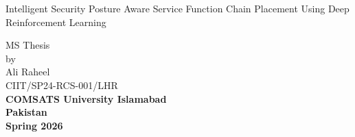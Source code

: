 \thispagestyle{empty}
\begin{center}
{\Huge{Intelligent Security Posture Aware Service Function Chain Placement Using
Deep Reinforcement Learning}}
\end{center}
\vspace{0.1in}
\begin{center}
\vspace{.8in}
\Large{MS Thesis}\\
\large{ by}\\
\Large {Ali Raheel}\\
\vspace{0.35in}
CIIT/SP24-RCS-001/LHR\\
\vspace{2in}
\Large {\textbf{COMSATS University Islamabad\\
Pakistan}}\\
\vspace{0.2in}
\Large{\textbf{Spring 2026}}
\end{center}

\newpage
\vspace{-1in}
\begin{center}
\end{center}

